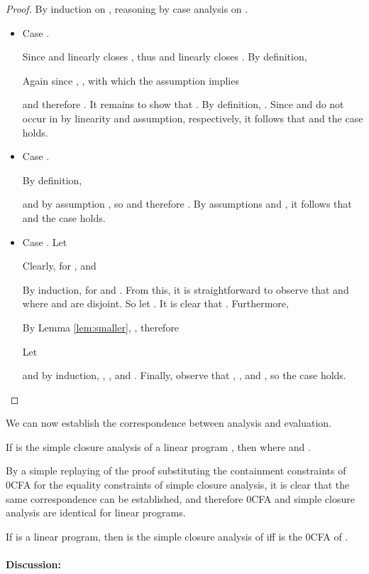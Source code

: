 \begin{proof} By induction on , reasoning by case analysis on .
\begin{itemize}
\item Case .

Since  and  linearly closes , thus  and  linearly closes
.  By definition,

Again since , , with which the
assumption  implies

and therefore .  It
remains to show that .
By definition, .  Since  and  do not
occur in  by linearity and assumption, respectively, it
follows that  and the case
holds.

\item Case .

By definition,

and by assumption , so  and therefore
.
By assumptions  and
, it follows that
 and
the case holds.

\item Case . Let

Clearly, for ,  and


By induction, for  and .  From this, it is straightforward to observe that
 and  where  and  are disjoint.  So let
.  It is
clear that .  Furthermore,


By Lemma \ref{lem:smaller},
, therefore 

Let

and by induction, , , and .  Finally, observe that
,
, and
, so the case holds.
\end{itemize}
\end{proof}
We can now establish the correspondence between analysis and
evaluation.

\begin{corollary}\label{cor:normal}
If  is the simple closure analysis of a linear program
, then  where
 and .
\end{corollary}

By a simple replaying of the proof substituting the containment
constraints of 0CFA for the equality constraints of simple closure
analysis, it is clear that the same correspondence can be established,
and therefore 0CFA and simple closure analysis are identical for
linear programs.

\begin{corollary}
If  is a linear program, then  is the simple closure
analysis of  iff  is the 0CFA of .
\end{corollary}

\paragraph{Discussion:}

